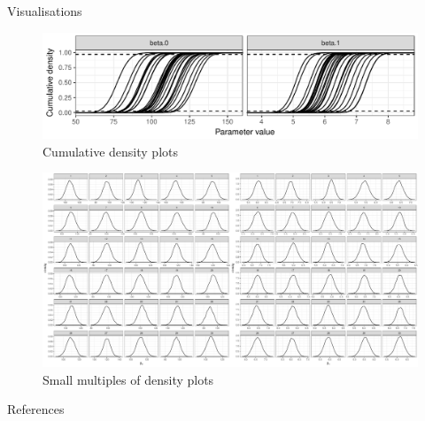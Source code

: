 {\begin{columns}
\begin{column}[t]{0.45\linewidth}
\begin{block}{Visualisations}
\begin{figure}
	\includegraphics[width=0.8\linewidth]{aitkin}
	\caption{Cumulative density plots}
\end{figure}


\begin{figure}
	\includegraphics[width=0.8\linewidth]{winbugs}
	\caption{Small multiples of density plots}
\end{figure}


\end{block}

\begin{block}{References}
\setlength{\parskip}{15pt}

\footnotesize




\end{block}
 \end{column}
\end{columns}

}

